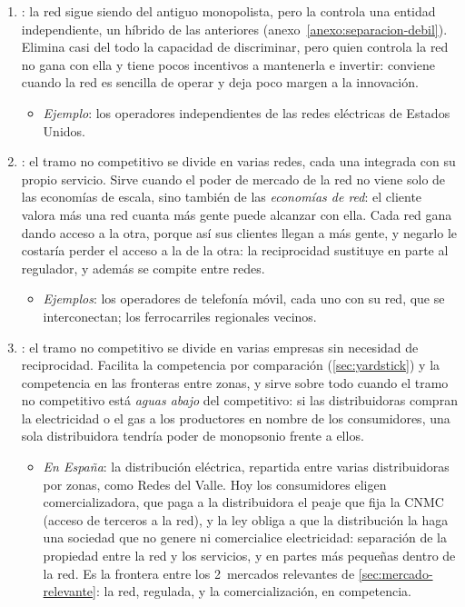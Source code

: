 \documentclass[11pt]{article}
\begin{document}
\begin{enumerate}
\begin{itemize}
  \end{itemize}
\item {}: la red sigue siendo del antiguo monopolista, pero la controla una entidad independiente, un híbrido de las anteriores (anexo~\ref{anexo:separacion-debil}). Elimina casi del todo la capacidad de discriminar, pero quien controla la red no gana con ella y tiene pocos incentivos a mantenerla e invertir: conviene cuando la red es sencilla de operar y deja poco margen a la innovación.
  \begin{itemize}
  \item \emph{Ejemplo}: los operadores independientes de las redes eléctricas de Estados Unidos.
  \end{itemize}
\item {}: el tramo no competitivo se divide en varias redes, cada una integrada con su propio servicio. Sirve cuando el poder de mercado de la red no viene solo de las economías de escala, sino también de las \emph{economías de red}: el cliente valora más una red cuanta más gente puede alcanzar con ella. Cada red gana dando acceso a la otra, porque así sus clientes llegan a más gente, y negarlo le costaría perder el acceso a la de la otra: la reciprocidad sustituye en parte al regulador, y además se compite entre redes.
  \begin{itemize}
  \item \emph{Ejemplos}: los operadores de telefonía móvil, cada uno con su red, que se interconectan; los ferrocarriles regionales vecinos.
  \end{itemize}
\item {}: el tramo no competitivo se divide en varias empresas sin necesidad de reciprocidad. Facilita la competencia por comparación (\ref{sec:yardstick}) y la competencia en las fronteras entre zonas, y sirve sobre todo cuando el tramo no competitivo está \emph{aguas abajo} del competitivo: si las distribuidoras compran la electricidad o el gas a los productores en nombre de los consumidores, una sola distribuidora tendría poder de monopsonio frente a ellos.
  \begin{itemize}
  \item \emph{En España}: la distribución eléctrica, repartida entre varias distribuidoras por zonas, como Redes del Valle. Hoy los consumidores eligen comercializadora, que paga a la distribuidora el peaje que fija la CNMC (acceso de terceros a la red), y la ley obliga a que la distribución la haga una sociedad que no genere ni comercialice electricidad\nocite{Ley24_2013SectorElectrico}: separación de la propiedad entre la red y los servicios, y en partes más pequeñas dentro de la red. Es la frontera entre los 2~mercados relevantes de \ref{sec:mercado-relevante}: la red, regulada, y la comercialización, en competencia.
  \end{itemize}
\end{enumerate}
\end{document}
